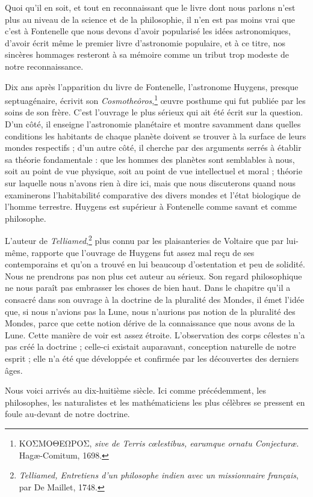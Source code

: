 \documentclass[a4paper, 11pt, oneside]{article}
\begin{document}
Quoi qu'il en soit, et tout en reconnaissant que le livre dont nous parlons n'est plus au niveau de la science et de la philosophie, il n'en est pas moins vrai que c'est à Fontenelle que nous devons d'avoir popularisé les idées astronomiques, d'avoir écrit même le premier livre d'astronomie populaire, et à ce titre, nos sincères hommages resteront à sa mémoire comme un tribut trop modeste de notre reconnaissance.

Dix ans après l'apparition du livre de Fontenelle, l'astronome Huygens, presque septuagénaire, écrivit son \emph{Cosmotheôros},\footnote{ΚΟΣΜΟΘΕΩΡΟΣ, \emph{sive de Terris cœlestibus, earumque ornatu Conjecturæ}. Hagæ-Comitum, 1698.} œuvre posthume qui fut publiée par les soins de son frère. C'est l'ouvrage le plus sérieux qui ait été écrit sur la question. D'un côté, il enseigne l'astronomie planétaire et montre savamment dans quelles conditions les habitants de chaque planète doivent se trouver à la surface de leurs mondes respectifs ; d'un autre côté, il cherche par des arguments serrés à établir sa théorie fondamentale : que les hommes des planètes sont semblables à nous, soit au point de vue physique, soit au point de vue intellectuel et moral ; théorie sur laquelle nous n'avons rien à dire ici, mais que nous discuterons quand nous examinerons l'habitabilité comparative des divers mondes et l'état biologique de l'homme terrestre. Huygens est supérieur à Fontenelle comme savant et comme philosophe.

L'auteur de \emph{Telliamed},\footnote{\emph{Telliamed, Entretiens d'un philosophe indien avec un missionnaire français}, par De Maillet, 1748.} plus connu par les plaisanteries de Voltaire que par lui-même, rapporte que l'ouvrage de Huygens fut assez mal reçu de ses contemporains et qu'on a trouvé en lui beaucoup d'ostentation et peu de solidité. Nous ne prendrons pas non plus cet auteur au sérieux. Son regard philosophique ne nous paraît pas embrasser les choses de bien haut. Dans le chapitre qu'il a consacré dans son ouvrage à la doctrine de la pluralité des Mondes, il émet l'idée que, si nous n'avions pas la Lune, nous n'aurions pas notion de la pluralité des Mondes, parce que cette notion dérive de la connaissance que nous avons de la Lune. Cette manière de voir est assez étroite. L'observation des corps célestes n'a pas créé la doctrine ; celle-ci existait auparavant, conception naturelle de notre esprit ; elle n'a été que développée et confirmée par les découvertes des derniers âges.

Nous voici arrivés au dix-huitième siècle. Ici comme précédemment, les philosophes, les naturalistes et les mathématiciens les plus célèbres se pressent en foule au-devant de notre doctrine.
\end{document}
